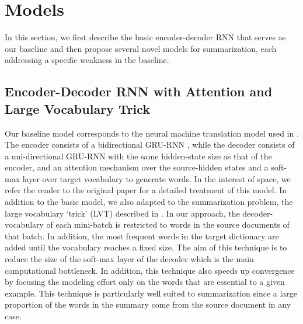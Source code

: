 
\section{Models}\label{sec:models}
In this section, we first describe the basic encoder-decoder RNN that serves as our baseline and then propose several novel models for summarization, each addressing a specific weakness in the baseline.

\subsection{Encoder-Decoder RNN with Attention and Large Vocabulary Trick}\label{sec:enc_dec}
Our baseline model corresponds to the neural machine translation model used in . The encoder consists of a bidirectional GRU-RNN \cite{gru_rnn}, while the decoder consists of a uni-directional GRU-RNN with the same hidden-state size as that of the encoder, and an attention mechanism over the source-hidden states and a soft-max layer over target vocabulary to generate words. In the interest of space, we refer the reader to the original paper for a detailed treatment of this model.
In addition to the basic model, we also adapted to the summarization problem, the large vocabulary `trick' (LVT) described in . In our approach, the decoder-vocabulary of each mini-batch is restricted to words in the source documents of that batch. In addition, the most frequent words in the target dictionary are added until the vocabulary reaches a fixed size. %
The aim of this technique is to reduce the size of the soft-max layer of the decoder which is the main computational bottleneck. In addition, this technique also speeds up convergence by focusing the modeling effort only on the words that are essential to a given example. This technique is particularly well suited to summarization since a large proportion of the words in the summary come from the source document in any case.


